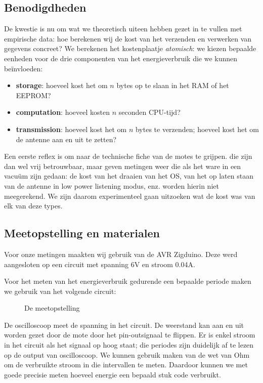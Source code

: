 \documentclass{article}
\begin{document}
\subsection{Benodigdheden}

De kwestie is nu om wat we theoretisch uiteen hebben gezet in te vullen met
empirische data: hoe berekenen wij de kost van het verzenden en verwerken van
gegevens concreet? We berekenen het kostenplaatje \textit{atomisch}: we kiezen
bepaalde eenheden voor de drie componenten van het energieverbruik die we kunnen
be\"invloeden:

\begin{itemize}
\item \textbf{storage}: hoeveel kost het om $n$ bytes op te slaan in het RAM of
het EEPROM?
\item \textbf{computation}: hoeveel kosten $n$ seconden CPU-tijd?
\item \textbf{transmission}: hoeveel kost het om $n$ bytes te verzenden; hoeveel
kost het om de antenne aan en uit te zetten?
\end{itemize}

Een eerste reflex is om naar de technische fiche van de motes te grijpen. die
zijn dan wel vrij betrouwbaar, maar geven metingen weer die als het ware in een
vacu\"um zijn gedaan: de kost van het draaien van het OS, van het op laten staan
van de antenne in low power listening modus, enz. worden hierin niet
meegerekend. We zijn daarom experimenteel gaan uitzoeken wat de kost was van elk
van deze types.

\subsection{Meetopstelling en materialen}

Voor onze metingen maakten wij gebruik van de AVR Zigduino. Deze werd
aangesloten op een circuit met spanning 6V en stroom 0.04A.

Voor het meten van het energieverbruik gedurende een bepaalde periode maken we gebruik van het volgende circuit:

\begin{figure}[h]
\centering
\missingfigure{}
\caption{De meetopstelling}
\label{fig:meetopstelling}
\end{figure}

De oscilloscoop meet de spanning in het circuit. De weerstand kan aan en uit
worden gezet door de mote door het pin-outsignaal te flippen. Er is enkel stroom
in het circuit als het signaal op hoog staat; die periodes zijn duidelijk af te
lezen op de output van oscilloscoop. We kunnen gebruik maken van de wet van Ohm
om de verbruikte stroom in die intervallen te meten. Daardoor kunnen we met
goede precisie meten hoeveel energie een bepaald stuk code verbruikt.
\end{document}
